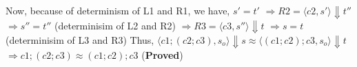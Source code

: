 \documentclass[a4paper, 11pt]{article}
\begin{document}
\begin{prooftree}

\end{prooftree}
Now, because of determinism of L1 and R1, we have, \newline
$ s' = t' $\newline
$\Rightarrow R2 = \langle c2, s' \rangle \Downarrow t''$\newline
$\Rightarrow s'' = t'' $ {\scriptsize(determinisim of L2 and R2)} \newline
$\Rightarrow R3 = \langle c3, s'' \rangle \Downarrow t$\newline
$\Rightarrow s = t $ {\scriptsize(determinisim of L3 and R3)} \newline
Thus, $\langle c1; (c2; c3), s_o \rangle \Downarrow s \approx \langle (c1; c2); c3, s_o \rangle \Downarrow t$\newline
$\Rightarrow c1; (c2; c3) \approx (c1; c2); c3$ (\textbf{Proved})
\end{document}
